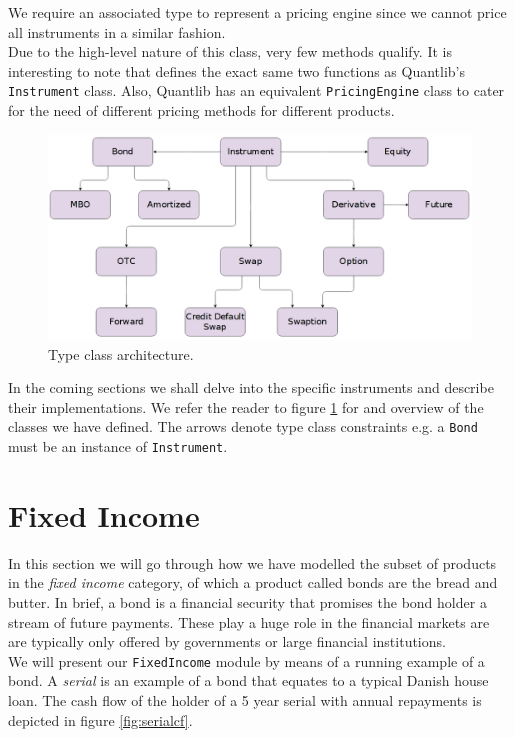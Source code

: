 We require an associated type to represent a pricing engine since we
cannot price all instruments in a similar fashion.\\
Due to the high-level nature of this class, very few methods qualify.
It is interesting to note that \hql defines the
exact same two functions as Quantlib's \texttt{Instrument}
class\cite{implql}. Also, Quantlib has an equivalent \texttt{PricingEngine}
class to cater for the need of different pricing methods for different
products.\\

\begin{figure}[!h]
\centering
\includegraphics[scale=.3]{images/classhier.png}
\caption{Type class architecture.}
\label{fig:classhier}
\end{figure}

In the coming sections we shall delve into the specific instruments and
describe their implementations. We refer the reader to figure \ref{fig:classhier}
for and overview of the classes we have defined. The arrows denote type class
constraints e.g. a \texttt{Bond} must be an instance of \texttt{Instrument}.

\section{Fixed Income}\label{sec:fi}

In this section we will go through how we have modelled the subset of products 
in the \emph{fixed income} category, of which a product called bonds are 
the bread and butter. In brief, a bond is a financial security that promises
the bond holder a stream of future payments. These play a huge role in the 
financial markets are are typically only offered by governments or large 
financial institutions.\\
We will present our \texttt{FixedIncome} module by means of a running example
of a bond. A \emph{serial} is an example of a bond that equates to a typical 
Danish house loan. The cash flow of the holder of a 5 year serial with annual 
repayments is depicted in figure \ref{fig:serialcf}.\\

